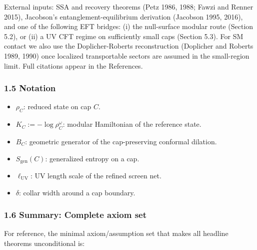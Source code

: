 \documentclass[
]{article}
\providecommand{\tightlist}{%
  \setlength{\itemsep}{0pt}\setlength{\parskip}{0pt}}
\begin{document}
External inputs: SSA and recovery theorems (Petz 1986, 1988; Fawzi and
Renner 2015), Jacobson's entanglement-equilibrium derivation (Jacobson
1995, 2016), and one of the following EFT bridges: (i) the null-surface
modular route (Section 5.2), or (ii) a UV CFT regime on sufficiently
small caps (Section 5.3). For SM contact we also use the
Doplicher-Roberts reconstruction (Doplicher and Roberts 1989, 1990) once
localized transportable sectors are assumed in the small-region limit.
Full citations appear in the References.

\subsubsection{1.5 Notation}\label{notation}

\begin{itemize}
\tightlist
\item
  \(\rho_C\): reduced state on cap \(C\).
\item
  \(K_C := -\log \rho_C^{\omega}\): modular Hamiltonian of the reference
  state.
\item
  \(B_C\): geometric generator of the cap-preserving conformal dilation.
\item
  \(S_{\mathrm{gen}}(C)\): generalized entropy on a cap.
\item
  \(\ell_{\mathrm{UV}}\): UV length scale of the refined screen net.
\item
  \(\delta\): collar width around a cap boundary.
\end{itemize}

\subsubsection{1.6 Summary: Complete axiom
set}\label{summary-complete-axiom-set}

For reference, the minimal axiom/assumption set that makes all headline
theorems unconditional is:
\end{document}
